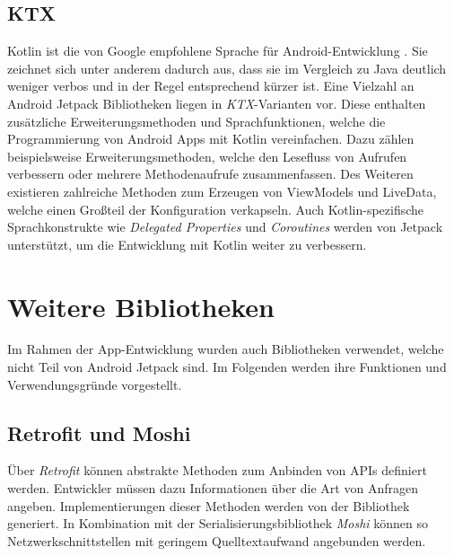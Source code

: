\subsection{KTX}
\label{subsec:app:jetpack:extensions}
Kotlin ist die von Google empfohlene Sprache für Android-Entwicklung \autocite{androidkotlin}.
Sie zeichnet sich unter anderem dadurch aus, dass sie im Vergleich zu Java deutlich weniger verbos und in der Regel entsprechend kürzer ist.
Eine Vielzahl an Android Jetpack Bibliotheken liegen in \textit{KTX}-Varianten vor.
Diese enthalten zusätzliche Erweiterungsmethoden und Sprachfunktionen, welche die Programmierung von Android Apps mit Kotlin vereinfachen.
Dazu zählen beispielsweise Erweiterungsmethoden, welche den Lesefluss von Aufrufen verbessern oder mehrere Methodenaufrufe zusammenfassen.
Des Weiteren existieren zahlreiche Methoden zum Erzeugen von ViewModels und LiveData, welche einen Großteil der Konfiguration verkapseln.
Auch Kotlin-spezifische Sprachkonstrukte wie \textit{Delegated Properties} und \textit{Coroutines} werden von Jetpack unterstützt, um die Entwicklung mit Kotlin weiter zu verbessern.

\section{Weitere Bibliotheken}
\label{sec:app:bibs}
Im Rahmen der App-Entwicklung wurden auch Bibliotheken verwendet, welche nicht Teil von Android Jetpack sind.
Im Folgenden werden ihre Funktionen und Verwendungsgründe vorgestellt.

\subsection{Retrofit und Moshi}
\label{subsec:app:bibs:retrofitmoshi}
Über \textit{Retrofit} können abstrakte Methoden zum Anbinden von APIs definiert werden.
Entwickler müssen dazu Informationen über die Art von Anfragen angeben.
Implementierungen dieser Methoden werden von der Bibliothek generiert.
In Kombination mit der Serialisierungsbibliothek \textit{Moshi} können so Netzwerkschnittstellen mit geringem Quelltextaufwand angebunden werden.

